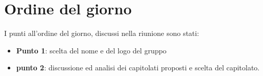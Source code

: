 \section{Ordine del giorno}
I punti all'ordine del giorno, discussi nella riunione sono stati:
\begin{itemize}

	\item \textbf{Punto 1}: scelta del nome e del logo del gruppo
	\item \textbf{punto 2}: discussione ed analisi dei capitolati proposti e scelta del capitolato.
\end{itemize}
